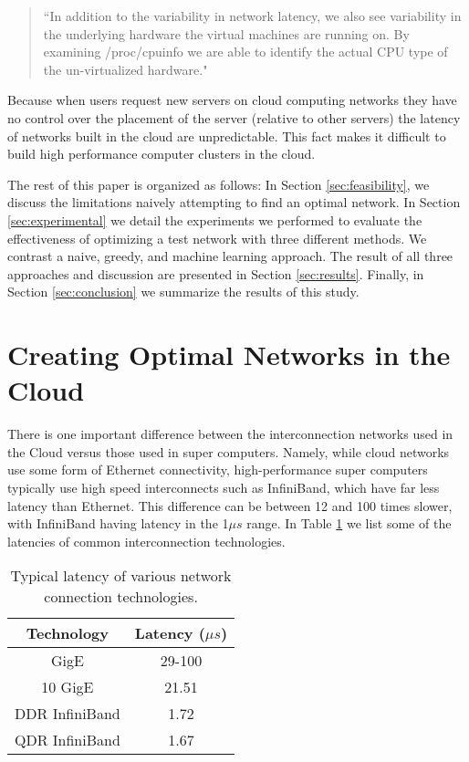 \begin{quote}
  ``In addition to the variability in network latency, we also see variability in the underlying hardware the virtual machines are running on. By examining /proc/cpuinfo we are able to identify the actual CPU type of the un-virtualized hardware."
\end{quote}


Because when users request new servers on cloud computing networks they have no control over the placement of the server (relative to other servers) the latency of networks built in the cloud are unpredictable. This fact makes it difficult to build high performance computer clusters in the cloud. 

The rest of this paper is organized as follows: In Section \ref{sec:feasibility}, we discuss the limitations naively attempting to find an optimal network. In Section \ref{sec:experimental} we detail the experiments we performed to evaluate the effectiveness of optimizing a test network with three different methods. We contrast a naive, greedy, and machine learning approach.  The result of all three approaches and discussion are presented in Section \ref{sec:results}. Finally, in Section \ref{sec:conclusion} we summarize the results of this study.      
    
\section{Creating Optimal Networks in the Cloud}

There is one important difference between the interconnection networks used in the Cloud versus those used in super computers. Namely, while cloud networks use some form of Ethernet connectivity, high-performance super computers typically use high speed interconnects such as InfiniBand, which have far less latency than Ethernet. This difference can be between 12 and 100 times slower, with InfiniBand having latency in the 1$\mu s$ range. In Table \ref{table:latencies} we list some of the latencies of common interconnection technologies.

\begin{table}[h]
\centering
\caption{Typical latency of various network connection technologies.}
\begin{tabular}{| c | c |}
\hline
Technology  & Latency ($\mu s$) \\
\hline
\hline
GigE & 29-100 \\
\hline 
10 GigE & 21.51 \\
\hline 
DDR InfiniBand  & 1.72 \\
\hline 
QDR InfiniBand & 1.67 \\
\hline 
\end{tabular}
\label{table:latencies}
\end{table}

